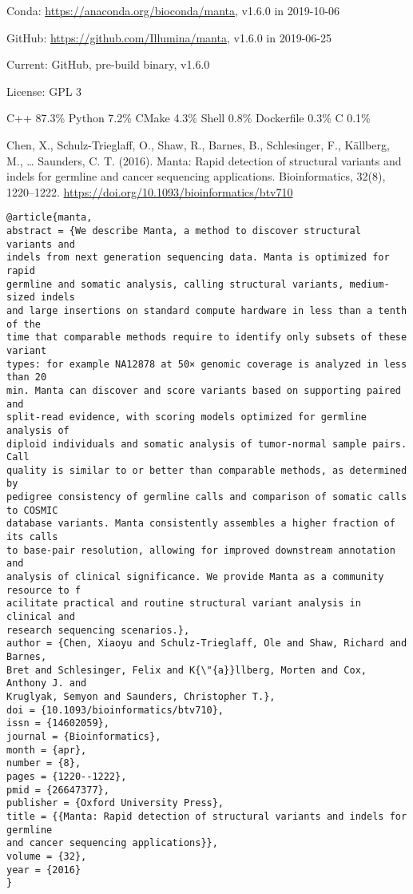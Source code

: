 \documentclass[]{article}
\begin{document}
Conda: \url{https://anaconda.org/bioconda/manta}, v1.6.0 in 2019-10-06

GitHub: \url{https://github.com/Illumina/manta}, v1.6.0 in 2019-06-25

Current: GitHub, pre-build binary, v1.6.0

License: GPL 3

C++ 87.3\% Python 7.2\% CMake 4.3\% Shell 0.8\% Dockerfile 0.3\% C 0.1\%

Chen, X., Schulz-Trieglaff, O., Shaw, R., Barnes, B., Schlesinger, F., Källberg, M., … Saunders, C. T. (2016). Manta: Rapid detection of structural variants and indels for germline and cancer sequencing applications. Bioinformatics, 32(8), 1220–1222. \url{https://doi.org/10.1093/bioinformatics/btv710}

\begin{verbatim}
@article{manta,
abstract = {We describe Manta, a method to discover structural variants and
indels from next generation sequencing data. Manta is optimized for rapid
germline and somatic analysis, calling structural variants, medium-sized indels
and large insertions on standard compute hardware in less than a tenth of the
time that comparable methods require to identify only subsets of these variant
types: for example NA12878 at 50× genomic coverage is analyzed in less than 20
min. Manta can discover and score variants based on supporting paired and
split-read evidence, with scoring models optimized for germline analysis of
diploid individuals and somatic analysis of tumor-normal sample pairs. Call
quality is similar to or better than comparable methods, as determined by
pedigree consistency of germline calls and comparison of somatic calls to COSMIC
database variants. Manta consistently assembles a higher fraction of its calls
to base-pair resolution, allowing for improved downstream annotation and
analysis of clinical significance. We provide Manta as a community resource to f
acilitate practical and routine structural variant analysis in clinical and
research sequencing scenarios.},
author = {Chen, Xiaoyu and Schulz-Trieglaff, Ole and Shaw, Richard and Barnes,
Bret and Schlesinger, Felix and K{\"{a}}llberg, Morten and Cox, Anthony J. and
Kruglyak, Semyon and Saunders, Christopher T.},
doi = {10.1093/bioinformatics/btv710},
issn = {14602059},
journal = {Bioinformatics},
month = {apr},
number = {8},
pages = {1220--1222},
pmid = {26647377},
publisher = {Oxford University Press},
title = {{Manta: Rapid detection of structural variants and indels for germline
and cancer sequencing applications}},
volume = {32},
year = {2016}
}
\end{verbatim}
\end{document}
